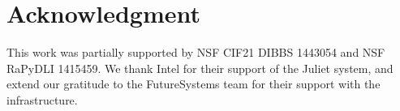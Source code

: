 \documentclass[conference]{IEEEtran}
\begin{document}
%






\section*{Acknowledgment}
This work was partially supported by NSF CIF21 DIBBS 1443054 and NSF RaPyDLI 1415459. We thank Intel  for their support of the Juliet system, and extend our gratitude to the FutureSystems team for their support with the infrastructure.

\ifCLASSOPTIONcaptionsoff
  \newpage
\fi



\balance
{}






\end{document}
